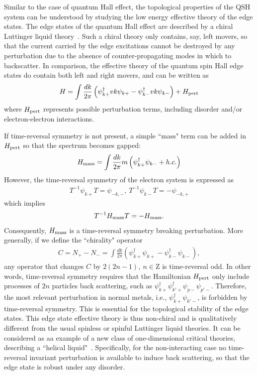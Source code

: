 \documentclass{article}
\begin{document}
Similar to the case of quantum Hall effect, the topological
properties of the QSH system can be understood by studying the low
energy effective theory of the edge states. The edge states of the
quantum Hall effect are described by a chiral Luttinger liquid
theory~\cite{wen1990}. Such a chiral theory only contains, say,
left movers, so that the current carried by the edge excitations
cannot be destroyed by any perturbation due to the absence of
counter-propagating modes in which to backscatter. In comparison,
the effective theory of the quantum spin Hall edge states do
contain both left and right movers, and can be written as
\begin{eqnarray}
H=\int
\frac{dk}{2\pi}\left(\psi^\dagger_{k+}vk\psi_{k+}-\psi^\dagger_{k-}vk\psi_{k-}\right)+H_{\rm
pert}\label{Effedge}
\end{eqnarray}
where $H_{\rm pert}$ represents possible perturbation terms,
including disorder and/or electron-electron interactions.

If time-reversal symmetry is not present, a simple ``mass" term
can be added in $H_{\rm pert}$ so that the spectrum becomes
gapped:
\begin{eqnarray}
H_{\rm
mass}=\int\frac{dk}{2\pi}m\left(\psi^\dagger_{k+}\psi_{k-}+h.c.\right)\nonumber
\end{eqnarray}
However, the time-reversal symmetry of the electron system is
expressed as
\begin{eqnarray}
T^{-1}\psi_{k+}T=\psi_{-k,-},~T^{-1}\psi_{k-}T=-\psi_{-k,+}
\end{eqnarray}
which implies
\begin{eqnarray}
T^{-1}H_{\rm mass}T=-H_{\rm mass}.\nonumber
\end{eqnarray}
Consequently, $H_{\rm mass}$ is a time-reversal symmetry breaking
perturbation. More generally, if we define the ``chirality" operator
\begin{eqnarray}
C=N_+-N_-=\int
\frac{dk}{2\pi}\left(\psi_{k+}^\dagger\psi_{k+}-\psi_{k-}^\dagger
\psi_{k-}\right)\nonumber,
\end{eqnarray}
any operator that changes $C$ by $2(2n-1),~n\in\mathrm{Z}$ is
time-reversal odd. In other words, time-reversal symmetry requires
that the Hamiltonian $H_{\rm pert}$ only include  processes of
$2n$ particles back scattering, such as
$\psi_{k+}^\dagger\psi_{k'+}^\dagger\psi_{p-}\psi_{p'-}$.
Therefore, the most relevant perturbation in normal metals, i.e.,
$\psi_{k+}^\dagger\psi_{k'-}$, is forbidden by time-reversal
symmetry. This is essential for the topological stability of the
edge states. This edge state effective theory is thus non-chiral
and is qualitatively different from the usual spinless or spinful
Luttinger liquid theories. It can be considered as aa example of a
new class of one-dimensional critical theories, describing a
``helical liquid"~\cite{wu2006,xu2006}. Specifically, for the
non-interacting case no time-reversal invariant perturbation is
available to induce back scattering, so that the edge state is
robust under any disorder.
\end{document}
